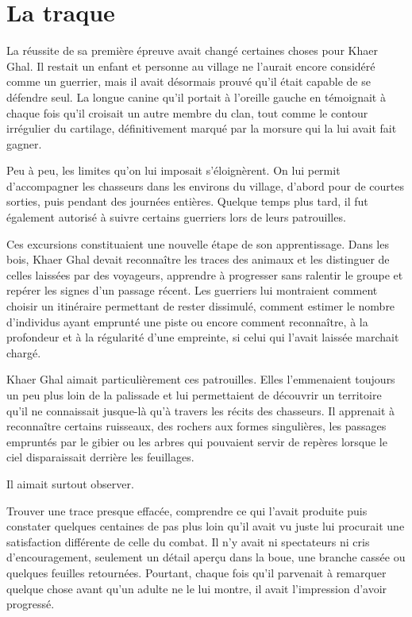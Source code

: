 \chapter{La traque}
\label{chap:la-traque}

La réussite de sa première épreuve avait changé certaines choses pour Khaer
Ghal. Il restait un enfant et personne au village ne l'aurait encore considéré
comme un guerrier, mais il avait désormais prouvé qu'il était capable de se
défendre seul. La longue canine qu'il portait à l'oreille gauche en témoignait
à chaque fois qu'il croisait un autre membre du clan, tout comme le contour
irrégulier du cartilage, définitivement marqué par la morsure qui la lui avait
fait gagner.

Peu à peu, les limites qu'on lui imposait s'éloignèrent. On lui permit
d'accompagner les chasseurs dans les environs du village, d'abord pour de
courtes sorties, puis pendant des journées entières. Quelque temps plus tard,
il fut également autorisé à suivre certains guerriers lors de leurs patrouilles.

Ces excursions constituaient une nouvelle étape de son apprentissage. Dans les
bois, Khaer Ghal devait reconnaître les traces des animaux et les distinguer de
celles laissées par des voyageurs, apprendre à progresser sans ralentir le
groupe et repérer les signes d'un passage récent. Les guerriers lui montraient
comment choisir un itinéraire permettant de rester dissimulé, comment estimer
le nombre d'individus ayant emprunté une piste ou encore comment reconnaître,
à la profondeur et à la régularité d'une empreinte, si celui qui l'avait
laissée marchait chargé.

Khaer Ghal aimait particulièrement ces patrouilles. Elles l'emmenaient toujours
un peu plus loin de la palissade et lui permettaient de découvrir un territoire
qu'il ne connaissait jusque-là qu'à travers les récits des chasseurs. Il
apprenait à reconnaître certains ruisseaux, des rochers aux formes singulières,
les passages empruntés par le gibier ou les arbres qui pouvaient servir de
repères lorsque le ciel disparaissait derrière les feuillages.

Il aimait surtout observer.

Trouver une trace presque effacée, comprendre ce qui l'avait produite puis
constater quelques centaines de pas plus loin qu'il avait vu juste lui
procurait une satisfaction différente de celle du combat. Il n'y avait ni
spectateurs ni cris d'encouragement, seulement un détail aperçu dans la boue,
une branche cassée ou quelques feuilles retournées. Pourtant, chaque fois qu'il
parvenait à remarquer quelque chose avant qu'un adulte ne le lui montre, il
avait l'impression d'avoir progressé.

